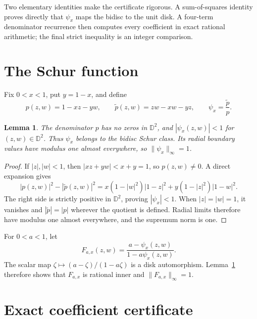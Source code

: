 \documentclass[11pt]{article}
\newtheorem{lemma}{Lemma}
\newcommand{\D}{\mathbb D}
\begin{document}
Two elementary identities make the certificate rigorous.  A sum-of-squares
identity proves directly that $\psi_x$ maps the bidisc to the unit disk.  A
four-term denominator recurrence then computes every coefficient in exact
rational arithmetic; the final strict inequality is an integer comparison.

\section{The Schur function}

Fix $0<x<1$, put $y=1-x$, and define
\begin{equation}\label{eq:psi}
 p(z,w)=1-xz-yw,
 \qquad
 \widetilde p(z,w)=zw-xw-yz,
 \qquad
 \psi_x=\frac{\widetilde p}{p}.
\end{equation}

\begin{lemma}\label{lem:schur}
The denominator $p$ has no zeros in $\D^2$, and $|\psi_x(z,w)|<1$ for
$(z,w)\in\D^2$.  Thus $\psi_x$ belongs to the bidisc Schur class.  Its
radial boundary values have modulus one almost everywhere, so
$\|\psi_x\|_\infty=1$.
\end{lemma}

\begin{proof}
If $|z|,|w|<1$, then $|xz+yw|<x+y=1$, so $p(z,w)\neq0$.
A direct expansion gives
\begin{equation}\label{eq:sos}
 |p(z,w)|^2-|\widetilde p(z,w)|^2
 =x(1-|w|^2)|1-z|^2+y(1-|z|^2)|1-w|^2.
\end{equation}
The right side is strictly positive in $\D^2$, proving $|\psi_x|<1$.
When $|z|=|w|=1$, it vanishes and $|\widetilde p|=|p|$ wherever the
quotient is defined.  Radial limits therefore have modulus one almost
everywhere, and the supremum norm is one.
\end{proof}

For $0<a<1$, let
\begin{equation}\label{eq:F}
 F_{a,x}(z,w)=\frac{a-\psi_x(z,w)}{1-a\psi_x(z,w)}.
\end{equation}
The scalar map $\zeta\mapsto(a-\zeta)/(1-a\zeta)$ is a disk automorphism.
Lemma~\ref{lem:schur} therefore shows that $F_{a,x}$ is rational inner and
$\|F_{a,x}\|_\infty=1$.

\section{Exact coefficient certificate}
\end{document}
